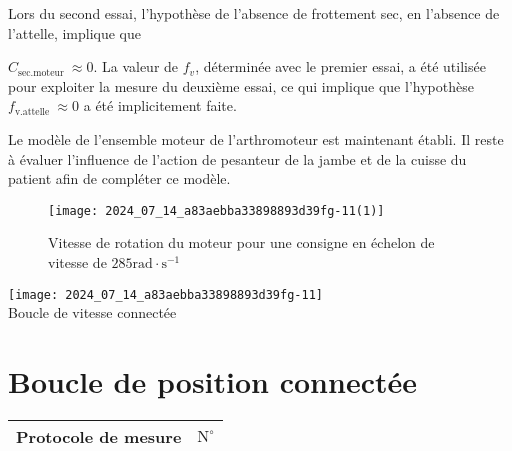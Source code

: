 Lors du second essai, l'hypothèse de l'absence de frottement sec, en l'absence de l'attelle, implique que

$C_{\text {sec.moteur }} \approx 0$. La valeur de $f_{v}$, déterminée avec le premier essai, a été utilisée pour exploiter la mesure du deuxième essai, ce qui implique que l'hypothèse $f_{\text {v.attelle }} \approx 0$ a été implicitement faite.


Le modèle de l'ensemble moteur de l'arthromoteur est maintenant établi. Il reste à évaluer l'influence de l'action de pesanteur de la jambe et de la cuisse du patient afin de compléter ce modèle.

\begin{figure}[!h]\centering
\texttt{[image: 2024\_07\_14\_a83aebba33898893d39fg-11(1)]}

\caption{\label{fig:ccs_mp_2024:fig:17}Vitesse de rotation du moteur pour une consigne en échelon de vitesse de $285 \mathrm{rad} \cdot \mathrm{s}^{-1}$}
\end{figure}

\texttt{[image: 2024\_07\_14\_a83aebba33898893d39fg-11]}$\qquad$\\
Boucle de vitesse connectée

\section*{Boucle de position connectée}
\begin{center}
\begin{tabular}{|l|l}
\hline
Protocole de mesure & $\mathrm{N}^{\circ}$ \\
\hline
\end{tabular}
\end{center}


